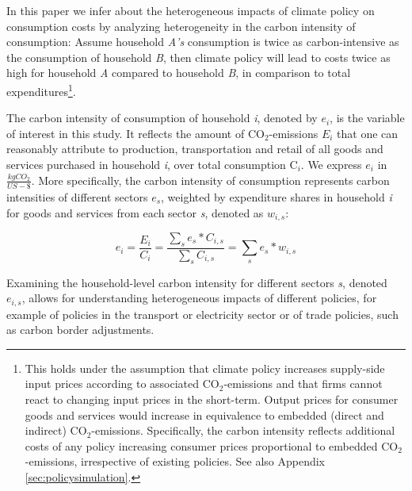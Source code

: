 \documentclass[12pt, a4paper]{article}
\begin{document}

In this paper we infer about the heterogeneous impacts of climate policy on consumption costs by analyzing heterogeneity in the carbon intensity of consumption: Assume household \textit{A's} consumption is twice as carbon-intensive as the consumption of household \textit{B}, then climate policy will lead to costs twice as high for household \textit{A} compared to household \textit{B}, in comparison to total expenditures\footnote{This holds under the assumption that climate policy increases supply-side input prices according to associated CO$_{2}$-emissions and that firms cannot react to changing input prices in the short-term. Output prices for consumer goods and services would increase in equivalence to embedded (direct and indirect) CO$_{2}$-emissions. Specifically, the carbon intensity reflects additional costs of any policy increasing consumer prices proportional to embedded CO$_{2}$-emissions, irrespective of existing policies. See also Appendix \ref{sec:policysimulation}.}.

The carbon intensity of consumption of household \textit{i}, denoted by $e_{i}$, is the variable of interest in this study. It reflects the amount of CO$_{2}$-emissions $E_{i}$ that one can reasonably attribute to production, transportation and retail of all goods and services purchased in household \textit{i}, over total consumption C$_{i}$. We express $e_{i}$ in $\frac{kgCO_{2}}{US-\$}$. More specifically, the carbon intensity of consumption represents carbon intensities of different sectors $e_{s}$, weighted by expenditure shares in household \textit{i} for goods and services from each sector \textit{s}, denoted as $w_{i,s}$:


\begin{equation} \label{eq:ei}
e_{i} = \frac{E_{i}}{C_{i}} = \frac{\sum_{s} e_{s}*C_{i,s}}{\sum_{s} C_{i,s}} = \sum_{s} e_{s}*w_{i,s}
\end{equation}


Examining the household-level carbon intensity for different sectors \textit{s}, denoted $e_{i,s}$, allows for understanding heterogeneous impacts of different policies, for example of policies in the transport or electricity sector or of trade policies, such as carbon border adjustments.
\end{document}
